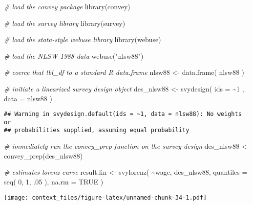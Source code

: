 \documentclass[
]{book}
\newenvironment{Shaded}{\begin{snugshade}}{\end{snugshade}}
\newcommand{\AttributeTok}[1]{\textcolor[rgb]{0.77,0.63,0.00}{#1}}
\newcommand{\CommentTok}[1]{\textcolor[rgb]{0.56,0.35,0.01}{\textit{#1}}}
\newcommand{\ConstantTok}[1]{\textcolor[rgb]{0.00,0.00,0.00}{#1}}
\newcommand{\DecValTok}[1]{\textcolor[rgb]{0.00,0.00,0.81}{#1}}
\newcommand{\FunctionTok}[1]{\textcolor[rgb]{0.00,0.00,0.00}{#1}}
\newcommand{\NormalTok}[1]{#1}
\newcommand{\OtherTok}[1]{\textcolor[rgb]{0.56,0.35,0.01}{#1}}
\newcommand{\SpecialCharTok}[1]{\textcolor[rgb]{0.00,0.00,0.00}{#1}}
\newcommand{\StringTok}[1]{\textcolor[rgb]{0.31,0.60,0.02}{#1}}
\begin{document}
\begin{Shaded}
\begin{Highlighting}[]
\CommentTok{\# load the convey package}
\FunctionTok{library}\NormalTok{(convey)}

\CommentTok{\# load the survey library}
\FunctionTok{library}\NormalTok{(survey)}

\CommentTok{\# load the stata{-}style webuse library}
\FunctionTok{library}\NormalTok{(webuse)}

\CommentTok{\# load the NLSW 1988 data}
\FunctionTok{webuse}\NormalTok{(}\StringTok{"nlsw88"}\NormalTok{)}

\CommentTok{\# coerce that \textasciigrave{}tbl\_df\textasciigrave{} to a standard R \textasciigrave{}data.frame\textasciigrave{}}
\NormalTok{nlsw88 }\OtherTok{\textless{}{-}} \FunctionTok{data.frame}\NormalTok{( nlsw88 )}

\CommentTok{\# initiate a linearized survey design object}
\NormalTok{des\_nlsw88 }\OtherTok{\textless{}{-}} \FunctionTok{svydesign}\NormalTok{( }\AttributeTok{ids =} \SpecialCharTok{\textasciitilde{}}\DecValTok{1}\NormalTok{ , }\AttributeTok{data =}\NormalTok{ nlsw88 )}
\end{Highlighting}
\end{Shaded}

\begin{verbatim}
## Warning in svydesign.default(ids = ~1, data = nlsw88): No weights or
## probabilities supplied, assuming equal probability
\end{verbatim}

\begin{Shaded}
\begin{Highlighting}[]
\CommentTok{\# immediately run the \textasciigrave{}convey\_prep\textasciigrave{} function on the survey design}
\NormalTok{des\_nlsw88 }\OtherTok{\textless{}{-}} \FunctionTok{convey\_prep}\NormalTok{(des\_nlsw88)}

\CommentTok{\# estimates lorenz curve}
\NormalTok{result.lin }\OtherTok{\textless{}{-}} \FunctionTok{svylorenz}\NormalTok{( }\SpecialCharTok{\textasciitilde{}}\NormalTok{wage, des\_nlsw88, }\AttributeTok{quantiles =} \FunctionTok{seq}\NormalTok{( }\DecValTok{0}\NormalTok{, }\DecValTok{1}\NormalTok{, .}\DecValTok{05}\NormalTok{ ), }\AttributeTok{na.rm =} \ConstantTok{TRUE}\NormalTok{ )}
\end{Highlighting}
\end{Shaded}

\texttt{[image: context\_files/figure-latex/unnamed-chunk-34-1.pdf]}
\end{document}

